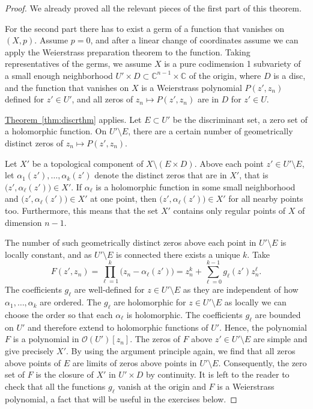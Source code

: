 \documentclass[12pt,openany]{book}
\newcommand{\C}{{\mathbb{C}}}
\newcommand{\sO}{{\mathscr{O}}}
\theoremstyle{plain}
\theoremstyle{remark}
\theoremstyle{definition}
\theoremstyle{exercise}
\theoremstyle{example}
\newcommand{\thmref}[1]{\hyperref[#1]{Theorem~\ref*{#1}}}
\begin{document}
\begin{proof}
We already proved all the relevant pieces of the first part of this
theorem.

For the second part there has to exist a germ of a function that vanishes on
$(X,p)$.  Assume $p=0$, and after a linear change
of coordinates assume we can apply the Weierstrass preparation theorem
to the function.  Taking representatives of the germs, we assume
$X$ is a pure codimension 1 subvariety of a small enough
neighborhood
$U' \times D \subset \C^{n-1} \times \C$ of the origin, where $D$ is a disc,
and the function that vanishes on $X$ is a
Weierstrass polynomial $P(z',z_n)$ defined for $z' \in U'$, and
all zeros of $z_n \mapsto P(z',z_n)$ are in $D$ for $z' \in U$.

\thmref{thm:discrthm} applies. Let
$E \subset U'$ be the discriminant set, a zero set of a
holomorphic function.
On $U' \setminus E$, there are a certain number of geometrically
distinct zeros of $z_n \mapsto P(z',z_n)$.

Let $X'$ be a topological component of $X \setminus ( E \times D )$.
Above each point $z' \in U' \setminus E$, let
$\alpha_1(z'),\ldots,\alpha_k(z')$ denote the distinct zeros that are in $X'$,
that is $\bigl(z',\alpha_\ell(z')\bigr) \in X'$.
If $\alpha_\ell$ is a holomorphic function in some small neighborhood and
$\bigl(z',\alpha_\ell(z')\bigr) \in X'$ at one point, then
$\bigl(z',\alpha_\ell(z')\bigr) \in X'$ for all nearby points too.
Furthermore, this means that the set $X'$ contains only regular points of $X$ of
dimension $n-1$.

The number of
such geometrically distinct zeros above each point in
$U' \setminus E$ is locally constant, and as $U' \setminus E$ is connected
there exists a unique $k$.  Take
\begin{equation*}
F(z',z_n) = \prod_{\ell=1}^k \bigl( z_n-\alpha_\ell(z')\bigr)
=
z_n^k + \sum_{\ell=0}^{k-1} g_\ell(z') z_n^\ell .
\end{equation*}
The coefficients $g_\ell$ are well-defined for $z \in U' \setminus E$
as they are independent of how $\alpha_1,\ldots,\alpha_k$ are ordered.
The $g_\ell$ are holomorphic for $z \in U' \setminus E$
as locally we can choose the order so that each $\alpha_\ell$ is
holomorphic.
The coefficients $g_\ell$ are bounded
on $U'$ and therefore extend to holomorphic functions of $U'$.
Hence, the polynomial $F$ is a polynomial
in $\sO(U')[z_n]$.
The zeros of $F$
above $z' \in U' \setminus E$
are simple and give precisely $X'$.
By using the argument principle
again, we find that all zeros above points of $E$ are limits of zeros
above points in $U' \setminus E$.
Consequently,
the zero set of $F$ is the closure of $X'$ in $U' \times D$ by continuity.
It is left to the reader to check that %
all the functions $g_\ell$ vanish at the origin and $F$ is a Weierstrass
polynomial, a fact that will be useful in the exercises below.


\end{proof}
\end{document}
